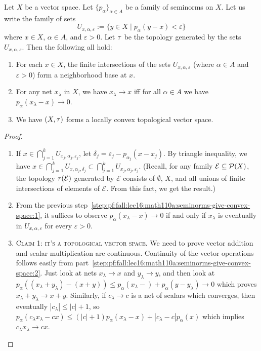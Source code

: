 \begin{framed}
\begin{theorem}
Let $X$ be a vector space. Let $\{p_{\alpha}\}_{\alpha\in A}$ be a
family of seminorms on $X$. Let us write the family of sets
\begin{equation}
U_{x,\alpha,\varepsilon}:=\{y\in X\mid p_{\alpha}(y-x)<\varepsilon\}
\end{equation}
where $x\in X$, $\alpha\in A$, and $\varepsilon>0$. Let $\tau$ be
the topology generated by the sets $U_{x,\alpha,\varepsilon}$. Then
the following all hold:
\begin{enumerate}
\item For each $x\in X$, the finite intersections of the sets
  $U_{x,\alpha,\varepsilon}$ (where $\alpha\in A$ and $\varepsilon>0$)
  form a neighborhood base at $x$.
\item For any net $x_{\lambda}$ in $X$, we have $x_{\lambda}\to x$ iff
  for all $\alpha\in A$ we have $p_{\alpha}(x_{\lambda}-x)\to0$.
\item We have $(X,\tau)$ forms a locally convex topological
  vector space.
\end{enumerate}
\end{theorem}

\begin{proof}
\begin{enumerate}
\item\label{step:pf:fall:lec16:math110a:seminorms-give-convex-space:1}
  If $x\in\bigcap^{k}_{j=1}U_{x_{j},\alpha_{j},\varepsilon_{j}}$, let $\delta_{j}=\varepsilon_{j}-p_{\alpha_{j}}(x-x_{j})$.
  By triangle inequality, we have $x\in\bigcap^{k}_{j=1}U_{x,\alpha_{j},\delta_{j}}\subset\bigcap^{k}_{j=1}U_{x_{j},\alpha_{j},\varepsilon_{j}}$.
  (Recall, for any family $\mathcal{E}\subseteq\mathcal{P}(X)$, the
  topology $\tau(\mathcal{E})$ generated by $\mathcal{E}$
  consists of $\emptyset$, $X$, and all unions of finite intersections
  of elements of $\mathcal{E}$. From this fact, we get the result.)
\item\label{step:pf:fall:lec16:math110a:seminorms-give-convex-space:2} From the previous step~\ref{step:pf:fall:lec16:math110a:seminorms-give-convex-space:1},
it suffices to observe $p_{\alpha}(x_{\lambda}-x)\to0$ if and only if
$x_{\lambda}$ is eventually in $U_{x,\alpha,\varepsilon}$ for every $\varepsilon>0$.
\item \textsc{Claim 1: it's a topological vector space}. We need to prove
  vector addition and scalar multiplication are continuous.
  Continuity of the vector operations follows easily from
  part~\ref{step:pf:fall:lec16:math110a:seminorms-give-convex-space:2}.
  Just look at nets $x_{\lambda}\to x$ and $y_{\lambda}\to y$, and
  then look at $p_{\alpha}((x_{\lambda}+y_{\lambda})-(x+y))\leq p_{\alpha}(x_{\lambda}-)+p_{\alpha}(y-y_{\lambda})\to0$
  which proves $x_{\lambda}+y_{\lambda}\to x+y$. Similarly, if
  $c_{\lambda}\to c$ is a net of scalars which converges, then
  eventually $|c_{\lambda}|\leq|c|+1$, so
  $p_{\alpha}(c_{\lambda}x_{\lambda}-cx)\leq(|c|+1)p_{\alpha}(x_{\lambda}-x)+|c_{\lambda}-c|p_{\alpha}(x)$
  which implies $c_{\lambda}x_{\lambda}\to cx$.
  

\end{enumerate}
\end{proof}
\end{framed}
